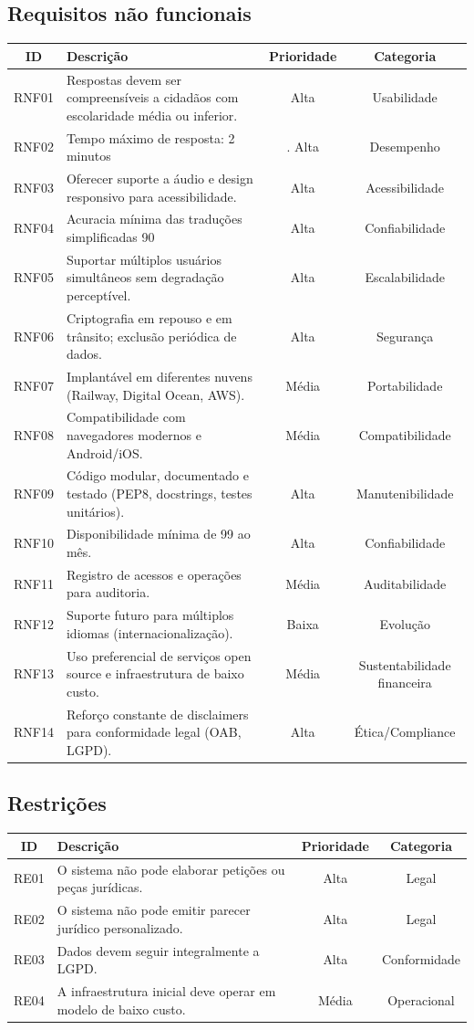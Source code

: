 \documentclass{article}
\begin{document}
\subsection*{Requisitos não funcionais}
\begin{tabular}{|c|p{7cm}|c|c|}
\hline
\textbf{ID} & \textbf{Descrição} & \textbf{Prioridade} & \textbf{Categoria} \\
\hline
RNF01&	Respostas devem ser compreensíveis a cidadãos com escolaridade média ou inferior.&	Alta&	Usabilidade\\\hline
RNF02& Tempo máximo de resposta: 2 minutos&.	Alta&	Desempenho\\\hline
RNF03&	Oferecer suporte a áudio e design responsivo para acessibilidade.&	Alta&	Acessibilidade\\\hline
RNF04&	Acuracia mínima das traduções simplificadas 90	&Alta &	Confiabilidade\\\hline
RNF05&	Suportar múltiplos usuários simultâneos sem degradação perceptível.&	Alta&	Escalabilidade\\\hline
RNF06&	Criptografia em repouso e em trânsito; exclusão periódica de dados.	&Alta&	Segurança\\\hline
RNF07&	Implantável em diferentes nuvens (Railway, Digital Ocean, AWS).	&Média	&Portabilidade\\\hline
RNF08&	Compatibilidade com navegadores modernos e Android/iOS.	&Média	&Compatibilidade\\\hline
RNF09&	Código modular, documentado e testado (PEP8, docstrings, testes unitários).&	Alta	&Manutenibilidade\\\hline
RNF10&	Disponibilidade mínima de 99 ao mês.	&Alta	&Confiabilidade\\\hline
RNF11&	Registro de acessos e operações para auditoria.	&Média	&Auditabilidade\\\hline
RNF12&	Suporte futuro para múltiplos idiomas (internacionalização).&	Baixa&	Evolução\\\hline
RNF13&	Uso preferencial de serviços open source e infraestrutura de baixo custo.&	Média&	Sustentabilidade financeira\\\hline
RNF14&	Reforço constante de disclaimers para conformidade legal (OAB, LGPD).&	Alta&	Ética/Compliance\\\hline
\end{tabular}
\subsection*{Restrições}
\begin{tabular}{|c|p{7cm}|c|c|}
\hline
\textbf{ID} & \textbf{Descrição} & \textbf{Prioridade} & \textbf{Categoria} \\
\hline
RE01&	O sistema não pode elaborar petições ou peças jurídicas.&	Alta&	Legal\\\hline
RE02&	O sistema não pode emitir parecer jurídico personalizado.&	Alta&	Legal\\\hline
RE03&	Dados devem seguir integralmente a LGPD.&	Alta	&Conformidade\\\hline
RE04&	A infraestrutura inicial deve operar em modelo de baixo custo.&	Média&	Operacional\\
\hline
\end{tabular}
\end{document}
